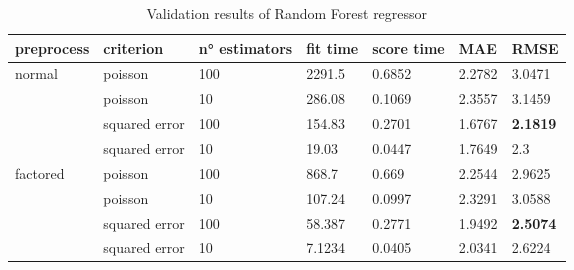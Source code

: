 \begin{table}[H]
    \centering
    \begin{tabular}{lll|llll}
    \toprule
    \textbf{preprocess} & \textbf{criterion} & \textbf{n° estimators} & \textbf{fit time} & \textbf{score time} & \textbf{MAE} & \textbf{RMSE} \\ \midrule
    \multirow{4}{*}{normal}     & poisson       & 100 & 2291.5 & 0.6852 & 2.2782 & 3.0471 \\
                                & poisson       & 10  & 286.08 & 0.1069 & 2.3557 & 3.1459 \\
                                & squared error & 100 & 154.83 & 0.2701 & 1.6767 & \textbf{2.1819} \\
                                & squared error & 10  & 19.03  & 0.0447 & 1.7649 & 2.3    \\
                                \midrule
    \multirow{4}{*}{factored}   & poisson       & 100 & 868.7  & 0.669  & 2.2544 & 2.9625 \\
                                & poisson       & 10  & 107.24 & 0.0997 & 2.3291 & 3.0588 \\
                                & squared error & 100 & 58.387 & 0.2771 & 1.9492 & \textbf{2.5074} \\
                                & squared error & 10  & 7.1234 & 0.0405 & 2.0341 & 2.6224 \\
    \bottomrule
    \end{tabular}
    \caption{Validation results of Random Forest regressor}
    \label{tab:val_rf}
\end{table}